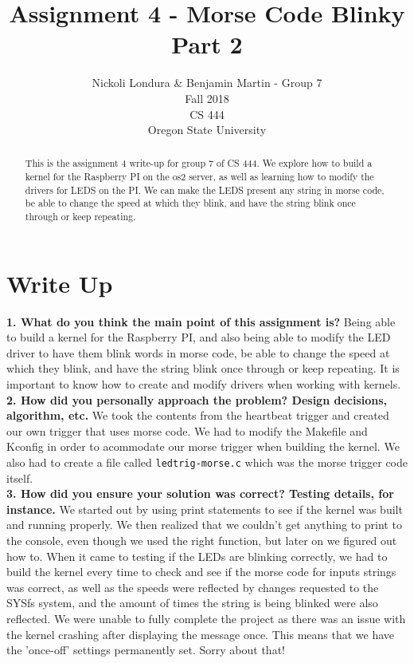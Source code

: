 \documentclass[10pt,english]{article}
\title{Assignment 4 - Morse Code Blinky Part 2}
\author{Nickoli Londura \& Benjamin Martin - Group 7 \\ Fall 2018 \\ CS 444 \\ Oregon State University}
\begin{document}
\maketitle

\begin{abstract}

\noindent This is the assignment 4 write-up for group 7 of CS 444. We explore how to build a kernel for the Raspberry PI on the os2 server, as well as learning how to modify the drivers for LEDS on the PI. We can make the LEDS present any string in morse code, be able to change the speed at which they blink, and have the string blink once through or keep repeating.

\end{abstract}

\newpage

\section{Write Up}

\textbf{1. What do you think the main point of this assignment is?}
Being able to build a kernel for the Raspberry PI, and also being able to modify the LED driver to have them blink words in morse code, be able to change the speed at which they blink, and have the string blink once through or keep repeating. It is important to know how to create and modify drivers when working with kernels. \\

\noindent \textbf{2. How did you personally approach the problem? Design decisions, algorithm, etc.}
We took the contents from the heartbeat trigger and created our own trigger that uses morse code. We had to modify the Makefile and Kconfig in order to acommodate our morse trigger when building the kernel. We also had to create a file called \verb|ledtrig-morse.c| which was the morse trigger code itself. \\


\noindent \textbf{3. How did you ensure your solution was correct? Testing details, for instance.}
We started out by using print statements to see if the kernel was built and running properly. We then realized that we couldn't get anything to print to the console, even though we used the right function, but later on we figured out how to. When it came to testing if the LEDs are blinking correctly, we had to build the kernel every time to check and see if the morse code for inputs strings was correct, as well as the speeds were reflected by changes requested to the SYSfs system, and the amount of times the string is being blinked were also reflected. We were unable to fully complete the project as there was an issue with the kernel crashing after displaying the message once. This means that we have the 'once-off' settings permanently set. Sorry about that!\\
\end{document}
